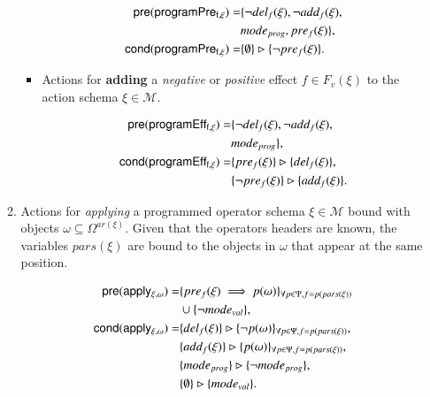 \documentclass[3p,times]{elsarticle}
\newcommand{\pre}{\mathsf{pre}}  %
\newcommand{\cond}{\mathsf{cond}}   %
\begin{document}
\begin{itemize}
\begin{enumerate}
\begin{itemize}
\begin{small}
\begin{align*}
\hspace*{7pt}\pre(\mathsf{programPre_{f,\xi}})=&\{\neg del_{f}(\xi),\neg add_{f}(\xi),\\
& mode_{prog}, pre_{f}(\xi)\},\\
\cond(\mathsf{programPre_{f,\xi}})=&\{\emptyset\}\rhd\{\neg pre_{f}(\xi)\}.
\end{align*}
\end{small}

\item Actions for {\bf adding} a {\em negative} or {\em positive} effect $f\in F_v(\xi)$ to the action schema $\xi\in\mathcal{M}$.

\begin{small}
\begin{align*}
\hspace*{7pt}\pre(\mathsf{programEff_{f,\xi}})=&\{\neg del_{f}(\xi),\neg add_{f}(\xi),\\
& mode_{prog}\},\\
\cond(\mathsf{programEff_{f,\xi}})=&\{pre_{f}(\xi)\}\rhd\{del_{f}(\xi)\},\\
&\{\neg pre_{f}(\xi)\}\rhd\{add_{f}(\xi)\}.
\end{align*}
\end{small}
\end{itemize}

\item Actions for {\em applying} a programmed operator schema $\xi\in\mathcal{M}$ bound with objects $\omega\subseteq\Omega^{ar(\xi)}$. Given that the operators headers are known, the variables $pars(\xi)$ are bound to the objects in $\omega$ that appear at the same position.
\begin{small}
\begin{align*}
\hspace*{7pt}\pre(\mathsf{apply_{\xi,\omega}})=&\{pre_{f}(\xi)\implies p(\omega)\}_{\forall p\in\Psi,f=p(pars(\xi))}\\
&\cup \{\neg mode_{val}\},\\
\cond(\mathsf{apply_{\xi,\omega}})=&\{del_{f}(\xi)\}\rhd\{\neg p(\omega)\}_{\forall p\in\Psi,f=p(pars(\xi))},\\
&\{add_{f}(\xi)\}\rhd\{p(\omega)\}_{\forall p\in\Psi,f=p(pars(\xi))},\\
&\{mode_{prog}\}\rhd\{\neg mode_{prog}\},\\
&\{\emptyset\}\rhd\{mode_{val}\}.
\end{align*}
\end{small}


\end{enumerate}
\end{itemize}
\end{document}
